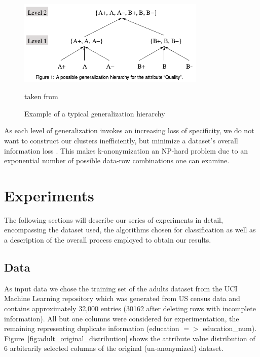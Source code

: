 \documentclass{llncs}
\begin{document}
\begin{figure}[h]
	\begin{center}
		\includegraphics[width=0.8\textwidth]{figures/theory/gen_hierarchy}
		\caption{Example of a typical generalization hierarchy}
		\label{fig:gen_hierarchy}
		\small
		taken from \cite{aggarwal2005approximation}
	\end{center}
\end{figure}


As each level of generalization invokes an increasing loss of specificity, we do not want to construct our clusters inefficiently, but minimize a dataset's overall information loss \cite{aggarwal2005approximation}. This makes k-anonymization an NP-hard problem due to an exponential number of possible data-row combinations one can examine.



\section{Experiments}
\label{sect:experiments}

The following sections will describe our series of experiments in detail, encompassing the dataset used, the algorithms chosen for classification as well as a description of the overall process employed to obtain our results.


\subsection{Data} 
\label{ssect:data}

As input data we chose the training set of the adults dataset from the UCI Machine Learning repository which was generated from US census data and contains approximately 32,000 entries (30162 after deleting rows with incomplete information). All but one columns were considered for experimentation, the remaining representing duplicate information (education $=>$ education\_num). Figure~\ref{fig:adult_original_distribution} shows the attribute value distribution of 6 arbitrarily selected columns of the original (un-anonymized) dataset.
\end{document}

